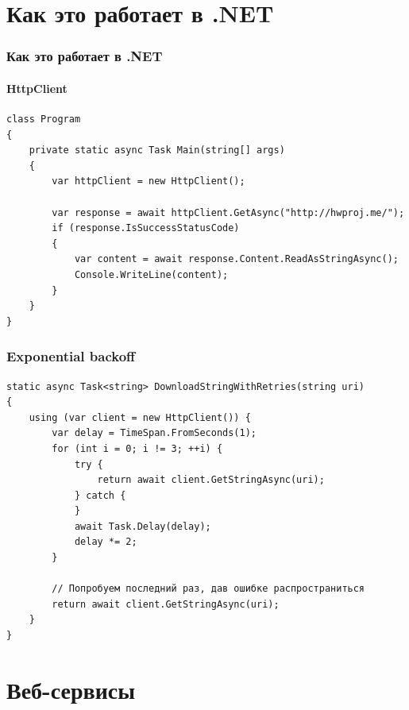 \documentclass[xetex,mathserif,serif]{beamer}
\begin{document}
    \section{Как это работает в .NET}

    \begin{frame}[fragile]
        \frametitle{Как это работает в .NET}
        \framesubtitle{HttpClient}
        \begin{verbatim}
class Program
{
    private static async Task Main(string[] args)
    {
        var httpClient = new HttpClient();

        var response = await httpClient.GetAsync("http://hwproj.me/");
        if (response.IsSuccessStatusCode)
        {
            var content = await response.Content.ReadAsStringAsync();
            Console.WriteLine(content);
        }
    }
}
        \end{verbatim}
    \end{frame}

    \begin{frame}[fragile]
        \frametitle{Exponential backoff}
        \begin{footnotesize}
            \begin{verbatim}
static async Task<string> DownloadStringWithRetries(string uri)
{
    using (var client = new HttpClient()) {
        var delay = TimeSpan.FromSeconds(1);
        for (int i = 0; i != 3; ++i) {
            try {
                return await client.GetStringAsync(uri);
            } catch {
            }
            await Task.Delay(delay);
            delay *= 2;
        }

        // Попробуем последний раз, дав ошибке распространиться
        return await client.GetStringAsync(uri);
    }
}
            \end{verbatim}
        \end{footnotesize}
    \end{frame}

    \section{Веб-сервисы}
\end{document}
